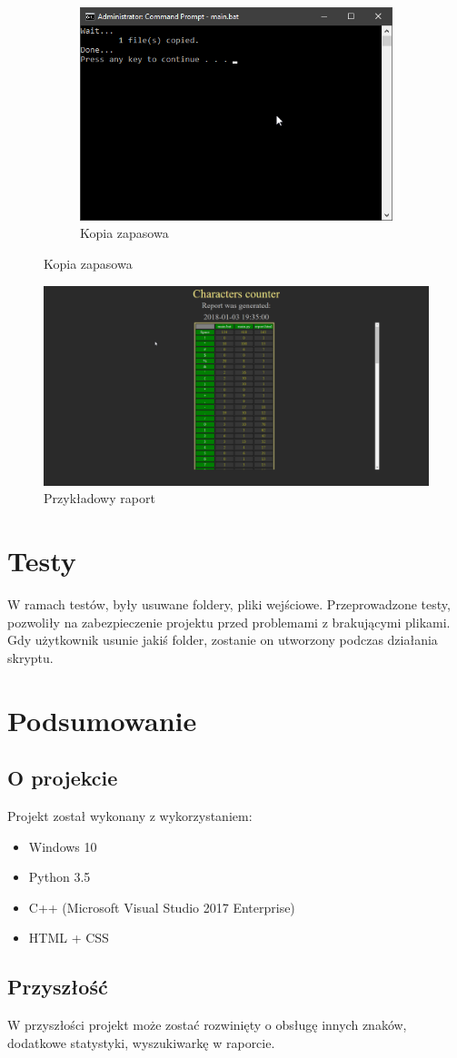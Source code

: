 \documentclass[]{article}
\begin{document}
\begin{figure}[H]
\begin{subfigure}{.3\textwidth}
	\includegraphics[width=1\linewidth]{prezentacja_3}
	\caption{Kopia zapasowa}
	\label{fig:p3}
\end{subfigure}
\end{figure}
\begin{figure}[H]
	\centering
	\includegraphics[width=1\linewidth]{report}
	\caption{Przykładowy raport}
	\label{fig:report}
\end{figure}
\section{Testy}
W ramach testów, były usuwane foldery, pliki wejściowe. Przeprowadzone testy, pozwoliły na zabezpieczenie projektu przed problemami z brakującymi plikami. Gdy użytkownik usunie jakiś folder, zostanie on utworzony podczas działania skryptu.
\section{Podsumowanie}
\subsection{O projekcie}
Projekt został wykonany z wykorzystaniem:
\begin{itemize}
\item Windows 10
\item Python 3.5
\item C++ (Microsoft Visual Studio 2017 Enterprise)
\item HTML + CSS
\end{itemize}
\subsection{Przyszłość}
W przyszłości projekt może zostać rozwinięty o obsługę innych znaków, dodatkowe statystyki, wyszukiwarkę w raporcie.
\end{document}
